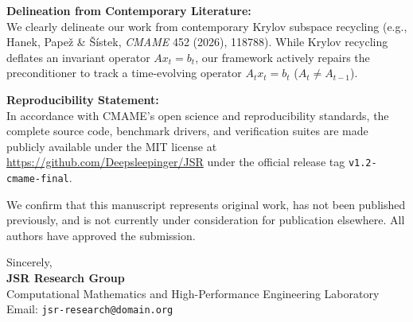 \documentclass[11pt,a4paper]{article}
\begin{document}
\vspace{0.8em}
\noindent
\textbf{Delineation from Contemporary Literature:}\\
We clearly delineate our work from contemporary Krylov subspace recycling (e.g., Hanek, Pape\v{z} \& \v{S}\'{i}stek, \textit{CMAME} 452 (2026), 118788). While Krylov recycling deflates an invariant operator $A x_t = b_t$, our framework actively repairs the preconditioner to track a time-evolving operator $A_t x_t = b_t$ ($A_t \neq A_{t-1}$).

\vspace{0.8em}
\noindent
\textbf{Reproducibility Statement:}\\
In accordance with CMAME's open science and reproducibility standards, the complete source code, benchmark drivers, and verification suites are made publicly available under the MIT license at \url{https://github.com/Deepsleepinger/JSR} under the official release tag \texttt{v1.2-cmame-final}.

\vspace{0.8em}
\noindent
We confirm that this manuscript represents original work, has not been published previously, and is not currently under consideration for publication elsewhere. All authors have approved the submission.

\vspace{1.5em}
\noindent
Sincerely,\\[1em]
\textbf{JSR Research Group}\\
Computational Mathematics and High-Performance Engineering Laboratory\\
Email: \texttt{jsr-research@domain.org}
\end{document}
